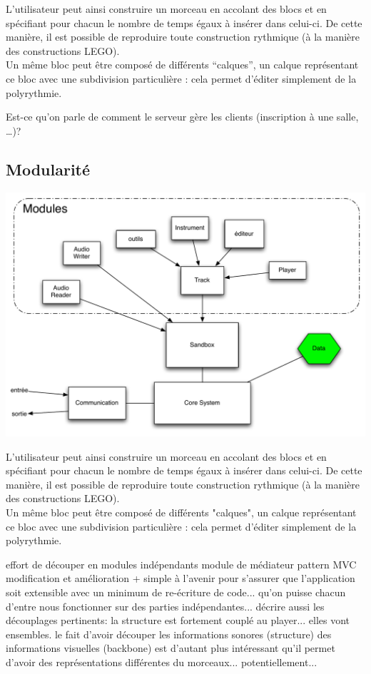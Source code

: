 \documentclass[pdftex,12pt,a4paper]{article}
\begin{document}
L’utilisateur peut ainsi construire un morceau en accolant des blocs et en spécifiant pour chacun le nombre de temps égaux à insérer dans celui-ci. De cette manière, il est possible de reproduire toute construction rythmique (à la manière des constructions LEGO).\\
Un même bloc peut être composé de différents “calques”, un calque représentant ce bloc avec une subdivision particulière : cela permet d’éditer simplement de la polyrythmie.

Est-ce qu’on parle de comment le serveur gère les clients (inscription à une salle, …)?

\subsection{Modularité}

\includegraphics[width=\linewidth]{./PSAR-Client}

L'utilisateur peut ainsi construire un morceau en accolant des blocs et en spécifiant pour chacun le nombre de temps égaux à insérer dans celui-ci. De cette manière, il est possible de reproduire toute construction rythmique (à la manière des constructions LEGO).\\
Un même bloc peut être composé de différents "calques", un calque représentant ce bloc avec une subdivision particulière : cela permet d'éditer simplement de la polyrythmie.

effort de découper en modules indépendants
module de médiateur
pattern MVC
modification et amélioration + simple à l’avenir
pour s’assurer que l’application soit extensible avec un minimum de re-écriture de code... qu’on puisse chacun d’entre nous fonctionner sur des parties indépendantes...
décrire aussi les découplages pertinents: la structure est fortement couplé au player... elles vont ensembles. le fait d’avoir découper les informations sonores (structure) des informations visuelles (backbone) est d’autant plus intéressant qu’il permet d’avoir des représentations différentes du morceaux... potentiellement...
\end{document}
